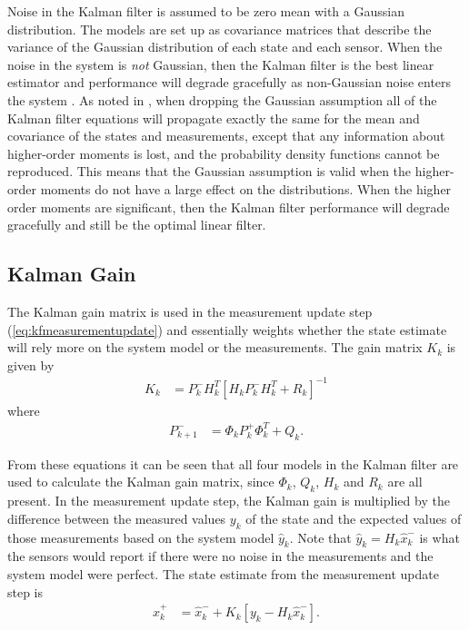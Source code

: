 Noise in the Kalman filter is assumed to be zero mean with a Gaussian distribution. The models are set up as covariance matrices that describe the variance of the Gaussian distribution of each state and each sensor. When the noise in the system is \textit{not} Gaussian, then the Kalman filter is the best linear estimator and performance will degrade gracefully as non-Gaussian noise enters the system \cite{Simon10}. As noted in \cite{AndersonMoore79}, when dropping the Gaussian assumption all of the Kalman filter equations will propagate exactly the same for the mean and covariance of the states and measurements, except that any information about higher-order moments is lost, and the probability density functions cannot be reproduced. This means that the Gaussian assumption is valid when the higher-order moments do not have a large effect on the distributions. When the higher order moments are significant, then the Kalman filter performance will degrade gracefully and still be the optimal linear filter.

\subsection{Kalman Gain}
\label{kfKalmanGain}
The Kalman gain matrix is used in the measurement update step (\ref{eq:kfmeasurementupdate}) and essentially weights whether the state estimate will rely more on the system model or the measurements. The gain matrix $K_k$ is given by
\begin{align*}
K_k &= P_k^-H_k^T\left[H_kP_k^-H_k^T + R_k\right]^{-1}
\end{align*}
where
\begin{align*}
P_{k+1}^- &= \Phi_kP_k^+\Phi_k^T + Q_k.
\end{align*}

From these equations it can be seen that all four models in the Kalman filter are used to calculate the Kalman gain matrix, since $\Phi_k$, $Q_k$, $H_k$ and $R_k$ are all present. In the measurement update step, the Kalman gain is multiplied by the difference between the measured values $y_k$ of the state and the expected values of those measurements based on the system model $\hat{y}_k$. Note that $\hat{y}_k = H_k\hat{x}_k^-$ is what the sensors would report if there were no noise in the measurements and the system model were perfect. The state estimate from the measurement update step is
\begin{align*}
\hat{x}_k^+ &= \hat{x}_k^- + K_k\left[y_k - H_k\hat{x}_k^-\right].
\end{align*}

